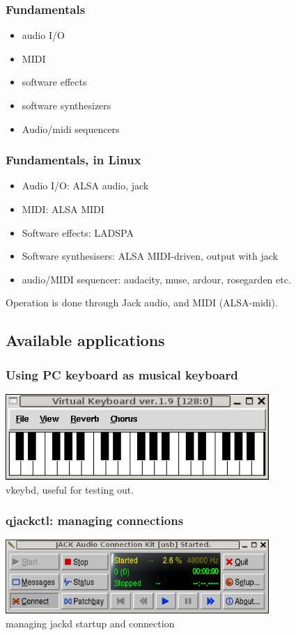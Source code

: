 \documentclass[dvipdfmx]{beamer}
\begin{document}
\begin{frame}
\frametitle{Fundamentals}
 \begin{itemize}
  \item audio I/O
  \item MIDI
  \item software effects
  \item software synthesizers
  \item Audio/midi sequencers
 \end{itemize}
\end{frame}

\begin{frame}
\frametitle{Fundamentals, in Linux}
 \begin{itemize}
  \item Audio I/O: ALSA audio, jack
  \item MIDI: ALSA MIDI
  \item Software effects: LADSPA
  \item Software synthesisers: ALSA MIDI-driven, output with jack
  \item audio/MIDI sequencer: audacity, muse, ardour, rosegarden etc.
 \end{itemize}
 Operation is done through Jack audio, and MIDI  (ALSA-midi).
\end{frame}

 \subsection{Available applications}
\begin{frame}
 \frametitle{Using PC keyboard as musical keyboard}
\includegraphics[width=10cm]{image200602/vkeybd.png}\\
 vkeybd, useful for testing out.
\end{frame}

\begin{frame}
 \frametitle{qjackctl: managing connections}
\includegraphics[width=10cm]{image200602/qjackctl-1.png}\\
managing jackd startup and connection
\end{frame}
\end{document}
